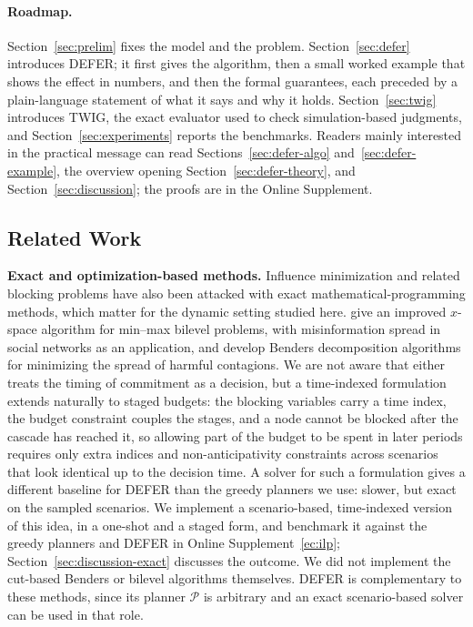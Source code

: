 \documentclass[ijoc,sglanonrev]{informs4}
\begin{document}
\paragraph{Roadmap.} Section~\ref{sec:prelim} fixes the model and the
problem. Section~\ref{sec:defer} introduces DEFER; it first gives the
algorithm, then a small worked example that shows the effect in numbers,
and then the formal guarantees, each preceded by a plain-language statement
of what it says and why it holds. Section~\ref{sec:twig} introduces TWIG, the
exact evaluator used to check simulation-based judgments, and
Section~\ref{sec:experiments} reports the benchmarks. Readers mainly
interested in the practical message can read Sections~\ref{sec:defer-algo}
and~\ref{sec:defer-example}, the overview opening
Section~\ref{sec:defer-theory}, and Section~\ref{sec:discussion}; the proofs
are in the Online Supplement.

\subsection{Related Work}\label{sec:related}

\textbf{Exact and optimization-based methods.} Influence minimization and
related blocking problems have also been attacked with exact
mathematical-programming methods, which matter for the dynamic setting studied
here. \citet{taninmis2022} give an improved $x$-space algorithm for min--max
bilevel problems, with misinformation spread in social networks as an
application, and \citet{taninmis2024} develop Benders decomposition algorithms
for minimizing the spread of harmful contagions. We are not aware that either
treats the timing of commitment as a decision, but a time-indexed formulation
extends naturally to staged budgets: the blocking variables carry a time
index, the budget constraint couples the stages, and a node cannot be blocked
after the cascade has reached it, so allowing part of the budget to be spent
in later periods requires only extra indices and non-anticipativity
constraints across scenarios that look identical up to the decision time. A
solver for such a formulation gives a different baseline for DEFER than the
greedy planners we use: slower, but exact on the sampled scenarios. We implement a
scenario-based, time-indexed version of this idea, in a one-shot and a staged
form, and benchmark it against the greedy planners and DEFER in
Online Supplement~\ref{ec:ilp}; Section~\ref{sec:discussion-exact} discusses
the outcome. We did not implement the cut-based Benders or bilevel algorithms
themselves. DEFER is complementary to these methods, since its planner
$\mathcal P$ is arbitrary and an exact scenario-based solver can be used in
that role.
\end{document}
